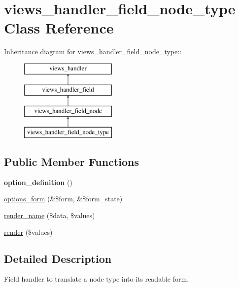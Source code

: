 \hypertarget{classviews__handler__field__node__type}{
\section{views\_\-handler\_\-field\_\-node\_\-type Class Reference}
\label{classviews__handler__field__node__type}
}
Inheritance diagram for views\_\-handler\_\-field\_\-node\_\-type::\begin{figure}[H]
\begin{center}
\leavevmode
\includegraphics[height=4cm]{classviews__handler__field__node__type}
\end{center}
\end{figure}
\subsection*{Public Member Functions}
\begin{DoxyCompactItemize}
\item 
\hypertarget{classviews__handler__field__node__type_a4e50103a014bff96644915cb0c8d33fd}{
{\bfseries option\_\-definition} ()}
\label{classviews__handler__field__node__type_a4e50103a014bff96644915cb0c8d33fd}

\item 
\hyperlink{classviews__handler__field__node__type_a0152124a453b32265e512bace19d6de4}{options\_\-form} (\&\$form, \&\$form\_\-state)
\item 
\hyperlink{classviews__handler__field__node__type_a16f19e2f652fd883b10a568eba122d5b}{render\_\-name} (\$data, \$values)
\item 
\hyperlink{classviews__handler__field__node__type_a13c9a516cca49870a1603fdd26071851}{render} (\$values)
\end{DoxyCompactItemize}


\subsection{Detailed Description}
Field handler to translate a node type into its readable form. 

